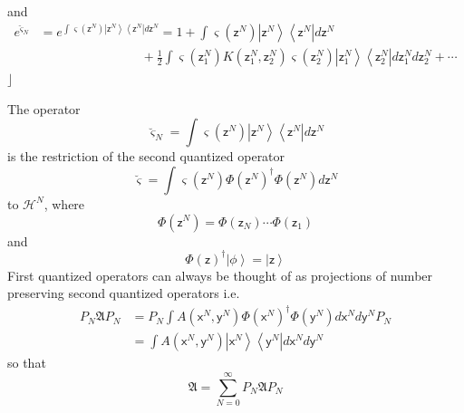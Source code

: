 \documentclass[aps,preprint]{revtex4}%
\begin{document}
and
\begin{align}
e^{\breve{\varsigma}_{N}}  &  =e^{\int\varsigma\left(  \mathsf{z}^{N}\right)
\left|  \mathsf{z}^{N}\right\rangle \left\langle \mathsf{z}^{N}\right|
d\mathsf{z}^{N}}=1+\int\varsigma\left(  \mathsf{z}^{N}\right)  \left|
\mathsf{z}^{N}\right\rangle \left\langle \mathsf{z}^{N}\right|  d\mathsf{z}%
^{N}\nonumber\\
&  \qquad\qquad\qquad\qquad+\frac{1}{2}\int\varsigma\left(  \mathsf{z}_{1}%
^{N}\right)  K\left(  \mathsf{z}_{1}^{N},\mathsf{z}_{2}^{N}\right)
\varsigma\left(  \mathsf{z}_{2}^{N}\right)  \left|  \mathsf{z}_{1}%
^{N}\right\rangle \left\langle \mathsf{z}_{2}^{N}\right|  d\mathsf{z}_{1}%
^{N}d\mathsf{z}_{2}^{N}+\cdots
\end{align}
$\rfloor$

The operator
\begin{equation}
\breve{\varsigma}_{N}=\int\varsigma\left(  \mathsf{z}^{N}\right)  \left\vert
\mathsf{z}^{N}\right\rangle \left\langle \mathsf{z}^{N}\right\vert
d\mathsf{z}^{N}%
\end{equation}
is the restriction of the second quantized operator%
\begin{equation}
\breve{\varsigma}=\int\varsigma\left(  \mathsf{z}^{N}\right)  \Phi\left(
\mathsf{z}^{N}\right)  ^{\dagger}\Phi\left(  \mathsf{z}^{N}\right)
d\mathsf{z}^{N}%
\end{equation}
to $\mathcal{H}^{N}$, where
\begin{equation}
\Phi\left(  \mathsf{z}^{N}\right)  =\Phi\left(  \mathsf{z}_{N}\right)
\cdots\Phi\left(  \mathsf{z}_{1}\right)
\end{equation}
and
\begin{equation}
\Phi\left(  \mathsf{z}\right)  ^{\dagger}\left\vert \phi\right\rangle
=\left\vert \mathsf{z}\right\rangle
\end{equation}
First quantized operators can always be thought of as projections of number
preserving second quantized operators i.e.
\begin{align}
P_{N}\mathfrak{A}P_{N} &  =P_{N}\int A\left(  \mathsf{x}^{N},\mathsf{y}%
^{N}\right)  \Phi\left(  \mathsf{x}^{N}\right)  ^{\dagger}\Phi\left(
\mathsf{y}^{N}\right)  d\mathsf{x}^{N}d\mathsf{y}^{N}P_{N}\nonumber\\
&  =\int A\left(  \mathsf{x}^{N},\mathsf{y}^{N}\right)  \left\vert
\mathsf{x}^{N}\right\rangle \left\langle \mathsf{y}^{N}\right\vert
d\mathsf{x}^{N}d\mathsf{y}^{N}%
\end{align}
so that
\begin{equation}
\mathfrak{A=}\sum_{N=0}^{\infty}P_{N}\mathfrak{A}P_{N}%
\end{equation}
\end{document}
